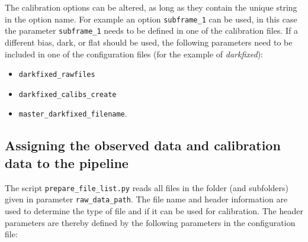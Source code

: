 \documentclass[10pt,a4paper]{article}
\begin{document}
\noindent The calibration options can be altered, as long as they contain the unique string in the option name. For example an option \verb|subframe_1| can be used, in this case the parameter \verb|subframe_1| needs to be defined in one of the calibration files. If a different bias, dark, or flat should be used, the following parameters need to be included in one of the configuration files (for the example of \textit{darkfixed}):
\begin{itemize}\setlength\itemsep{0em}
  \item \verb|darkfixed_rawfiles|
  \item \verb|darkfixed_calibs_create|
  \item \verb|master_darkfixed_filename|.
\end{itemize}


\subsection{Assigning the observed data and calibration data to the pipeline}
\label{Section:prepare_files}

The script \verb|prepare_file_list.py| reads all files in the folder (and subfolders) given in parameter \verb|raw_data_path|. The file name and header information are used to determine the type of file and if it can be used for calibration. The header parameters are thereby defined by the following parameters in the configuration file:
\end{document}
